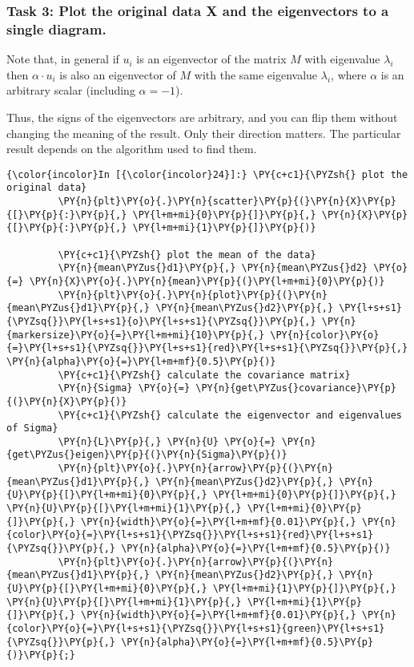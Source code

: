     \hypertarget{task-3-plot-the-original-data-x-and-the-eigenvectors-to-a-single-diagram.}{%
\subsubsection{Task 3: Plot the original data X and the eigenvectors to
a single
diagram.}\label{task-3-plot-the-original-data-x-and-the-eigenvectors-to-a-single-diagram.}}

Note that, in general if \(u_i\) is an eigenvector of the matrix \(M\)
with eigenvalue \(\lambda_i\) then \(\alpha \cdot u_i\) is also an
eigenvector of \(M\) with the same eigenvalue \(\lambda_i\), where
\(\alpha\) is an arbitrary scalar (including \(\alpha=-1\)).

Thus, the signs of the eigenvectors are arbitrary, and you can flip them
without changing the meaning of the result. Only their direction
matters. The particular result depends on the algorithm used to find
them.

    \begin{Verbatim}[commandchars=\\\{\}]
{\color{incolor}In [{\color{incolor}24}]:} \PY{c+c1}{\PYZsh{} plot the original data}
         \PY{n}{plt}\PY{o}{.}\PY{n}{scatter}\PY{p}{(}\PY{n}{X}\PY{p}{[}\PY{p}{:}\PY{p}{,} \PY{l+m+mi}{0}\PY{p}{]}\PY{p}{,} \PY{n}{X}\PY{p}{[}\PY{p}{:}\PY{p}{,} \PY{l+m+mi}{1}\PY{p}{]}\PY{p}{)}
         
         \PY{c+c1}{\PYZsh{} plot the mean of the data}
         \PY{n}{mean\PYZus{}d1}\PY{p}{,} \PY{n}{mean\PYZus{}d2} \PY{o}{=} \PY{n}{X}\PY{o}{.}\PY{n}{mean}\PY{p}{(}\PY{l+m+mi}{0}\PY{p}{)}
         \PY{n}{plt}\PY{o}{.}\PY{n}{plot}\PY{p}{(}\PY{n}{mean\PYZus{}d1}\PY{p}{,} \PY{n}{mean\PYZus{}d2}\PY{p}{,} \PY{l+s+s1}{\PYZsq{}}\PY{l+s+s1}{o}\PY{l+s+s1}{\PYZsq{}}\PY{p}{,} \PY{n}{markersize}\PY{o}{=}\PY{l+m+mi}{10}\PY{p}{,} \PY{n}{color}\PY{o}{=}\PY{l+s+s1}{\PYZsq{}}\PY{l+s+s1}{red}\PY{l+s+s1}{\PYZsq{}}\PY{p}{,} \PY{n}{alpha}\PY{o}{=}\PY{l+m+mf}{0.5}\PY{p}{)}
         \PY{c+c1}{\PYZsh{} calculate the covariance matrix}
         \PY{n}{Sigma} \PY{o}{=} \PY{n}{get\PYZus{}covariance}\PY{p}{(}\PY{n}{X}\PY{p}{)}
         \PY{c+c1}{\PYZsh{} calculate the eigenvector and eigenvalues of Sigma}
         \PY{n}{L}\PY{p}{,} \PY{n}{U} \PY{o}{=} \PY{n}{get\PYZus{}eigen}\PY{p}{(}\PY{n}{Sigma}\PY{p}{)}
         \PY{n}{plt}\PY{o}{.}\PY{n}{arrow}\PY{p}{(}\PY{n}{mean\PYZus{}d1}\PY{p}{,} \PY{n}{mean\PYZus{}d2}\PY{p}{,} \PY{n}{U}\PY{p}{[}\PY{l+m+mi}{0}\PY{p}{,} \PY{l+m+mi}{0}\PY{p}{]}\PY{p}{,} \PY{n}{U}\PY{p}{[}\PY{l+m+mi}{1}\PY{p}{,} \PY{l+m+mi}{0}\PY{p}{]}\PY{p}{,} \PY{n}{width}\PY{o}{=}\PY{l+m+mf}{0.01}\PY{p}{,} \PY{n}{color}\PY{o}{=}\PY{l+s+s1}{\PYZsq{}}\PY{l+s+s1}{red}\PY{l+s+s1}{\PYZsq{}}\PY{p}{,} \PY{n}{alpha}\PY{o}{=}\PY{l+m+mf}{0.5}\PY{p}{)}
         \PY{n}{plt}\PY{o}{.}\PY{n}{arrow}\PY{p}{(}\PY{n}{mean\PYZus{}d1}\PY{p}{,} \PY{n}{mean\PYZus{}d2}\PY{p}{,} \PY{n}{U}\PY{p}{[}\PY{l+m+mi}{0}\PY{p}{,} \PY{l+m+mi}{1}\PY{p}{]}\PY{p}{,} \PY{n}{U}\PY{p}{[}\PY{l+m+mi}{1}\PY{p}{,} \PY{l+m+mi}{1}\PY{p}{]}\PY{p}{,} \PY{n}{width}\PY{o}{=}\PY{l+m+mf}{0.01}\PY{p}{,} \PY{n}{color}\PY{o}{=}\PY{l+s+s1}{\PYZsq{}}\PY{l+s+s1}{green}\PY{l+s+s1}{\PYZsq{}}\PY{p}{,} \PY{n}{alpha}\PY{o}{=}\PY{l+m+mf}{0.5}\PY{p}{)}\PY{p}{;}
\end{Verbatim}

